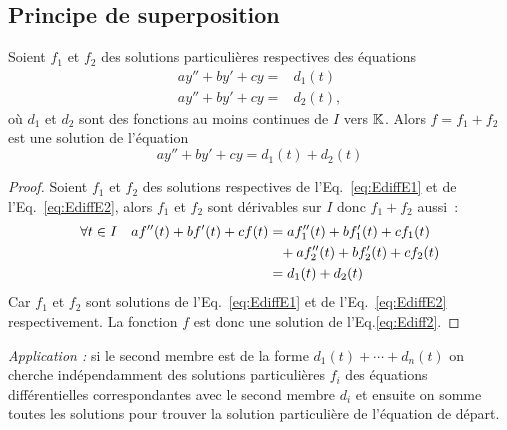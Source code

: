 \subsection{Principe de superposition}
\begin{prop}
  Soient $f_1$ et $f_2$ des solutions particulières respectives des équations
  \begin{align}
    ay''+by'+cy=&d_1(t) \label{eq:EdiffE1}\\ 
    ay''+by'+cy=&d_2(t) \label{eq:EdiffE2},
  \end{align}
où $d_1$ et $d_2$ sont des fonctions au moins continues de $I$ vers $\mathbb{K}$. Alors $f=f_1+f_2$ est une solution de l'équation
\begin{equation}
  ay''+by'+cy=d_1(t)+d_2(t)
\end{equation}
\end{prop}
\begin{proof}
  Soient $f_1$ et $f_2$ des solutions respectives de l'Eq.~\eqref{eq:EdiffE1} et de l'Eq.~\eqref{eq:EdiffE2}, alors $f_1$ et $f_2$ sont dérivables sur $I$ donc $f_1+f_2$ aussi~:
  \begin{align}
    \forall t \in I \quad af''(t)+bf'(t)+cf(t)&=af_1''(t)+bf_1'(t)+cf_1(t) \notag \\ %
    &\phantom{=}+af_2''(t)+bf_2'(t)+cf_2(t)\\ &=d_1(t)+d_2(t)
  \end{align}
Car $f_1$ et $f_2$ sont solutions de l'Eq.~\eqref{eq:EdiffE1} et de l'Eq.~\eqref{eq:EdiffE2} respectivement. La fonction $f$ est donc une solution de l'Eq.\eqref{eq:Ediff2}.
\end{proof}
\emph{Application :} si le second membre est de la forme $d_1(t)+ \dotsb +d_n(t)$ on cherche indépendamment des solutions particulières $f_i$ des équations différentielles correspondantes avec le second membre $d_i$ et ensuite on somme toutes les solutions pour trouver la solution particulière de l'équation de départ.

